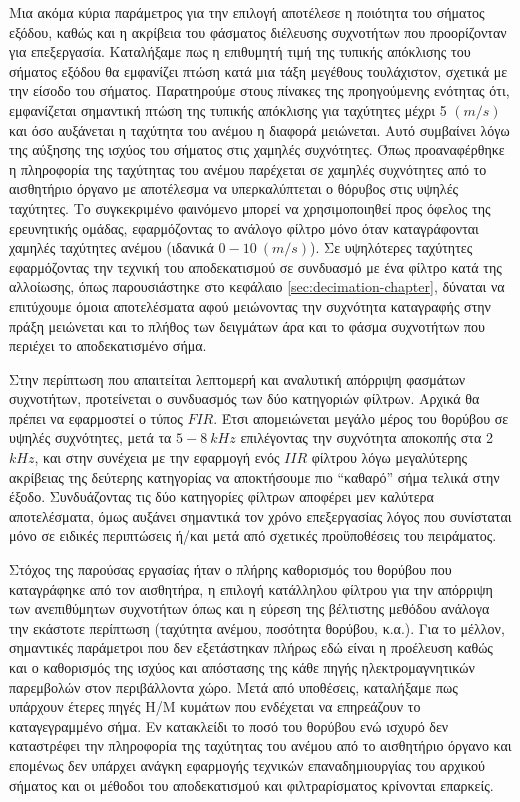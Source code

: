 \documentclass[breaklines=true, 12pt]{article}
\begin{document}
Μια ακόμα κύρια παράμετρος για την επιλογή αποτέλεσε η ποιότητα του σήματος
εξόδου, καθώς και η ακρίβεια του φάσματος διέλευσης συχνοτήτων που
προορίζονταν για επεξεργασία. Καταλήξαμε πως η επιθυμητή τιμή της τυπικής
απόκλισης του σήματος εξόδου θα εμφανίζει πτώση κατά μια τάξη μεγέθους
τουλάχιστον, σχετικά με την είσοδο του σήματος. Παρατηρούμε στους πίνακες της
προηγούμενης ενότητας ότι, εμφανίζεται σημαντική πτώση της τυπικής απόκλισης
για ταχύτητες μέχρι 5 \((m/s)\) και όσο αυξάνεται η ταχύτητα του ανέμου η διαφορά
μειώνεται. Αυτό συμβαίνει λόγω της αύξησης της ισχύος του σήματος στις χαμηλές
συχνότητες. Όπως προαναφέρθηκε η πληροφορία της ταχύτητας του ανέμου παρέχεται
σε χαμηλές συχνότητες από το αισθητήριο όργανο με αποτέλεσμα να υπερκαλύπτεται
ο θόρυβος στις υψηλές ταχύτητες. Το συγκεκριμένο φαινόμενο μπορεί να
χρησιμοποιηθεί προς όφελος της ερευνητικής ομάδας, εφαρμόζοντας το ανάλογο
φίλτρο μόνο όταν καταγράφονται χαμηλές ταχύτητες ανέμου (ιδανικά \(0-10\ (m/s)\)).
Σε υψηλότερες ταχύτητες εφαρμόζοντας την τεχνική του αποδεκατισμού σε συνδυασμό
με ένα φίλτρο κατά της αλλοίωσης, όπως παρουσιάστηκε στο κεφάλαιο
\ref{sec:decimation-chapter}, δύναται να επιτύχουμε όμοια αποτελέσματα αφού
μειώνοντας την συχνότητα καταγραφής στην πράξη μειώνεται και το πλήθος των
δειγμάτων άρα και το φάσμα συχνοτήτων που περιέχει το αποδεκατισμένο σήμα.

Στην περίπτωση που απαιτείται λεπτομερή και αναλυτική απόρριψη φασμάτων
συχνοτήτων, προτείνεται ο συνδυασμός των δύο κατηγοριών φίλτρων. Αρχικά θα
πρέπει να εφαρμοστεί ο τύπος \(FIR\). Έτσι απομειώνεται μεγάλο μέρος του θορύβου
σε υψηλές συχνότητες, μετά τα \(5-8\ kHz\) επιλέγοντας την συχνότητα αποκοπής στα
2 \(kHz\), και στην συνέχεια με την εφαρμογή ενός \(IIR\) φίλτρου λόγω μεγαλύτερης
ακρίβειας της δεύτερης κατηγορίας να αποκτήσουμε πιο “καθαρό” σήμα τελικά στην
έξοδο. Συνδυάζοντας τις δύο κατηγορίες φίλτρων αποφέρει μεν καλύτερα αποτελέσματα,
όμως αυξάνει σημαντικά τον χρόνο επεξεργασίας λόγος που συνίσταται μόνο σε
ειδικές περιπτώσεις ή/και μετά από σχετικές προϋποθέσεις του πειράματος.

Στόχος της παρούσας εργασίας ήταν ο πλήρης καθορισμός του θορύβου που
καταγράφηκε από τον αισθητήρα,
η επιλογή κατάλληλου φίλτρου για την απόρριψη των ανεπιθύμητων συχνοτήτων όπως
και η εύρεση της βέλτιστης μεθόδου ανάλογα την εκάστοτε περίπτωση (ταχύτητα
ανέμου, ποσότητα θορύβου, κ.α.). Για το μέλλον, σημαντικές παράμετροι που δεν
εξετάστηκαν πλήρως εδώ είναι η προέλευση καθώς και ο καθορισμός της ισχύος και
απόστασης της κάθε πηγής ηλεκτρομαγνητικών παρεμβολών στον περιβάλλοντα χώρο.
Μετά από υποθέσεις, καταλήξαμε πως υπάρχουν έτερες πηγές Η/Μ κυμάτων που ενδέχεται
να επηρεάζουν το καταγεγραμμένο σήμα. Εν κατακλείδι το ποσό του θορύβου ενώ
ισχυρό δεν καταστρέφει την πληροφορία της ταχύτητας του ανέμου από το
αισθητήριο όργανο και επομένως δεν υπάρχει ανάγκη εφαρμογής τεχνικών
επαναδημιουργίας του αρχικού σήματος και οι μέθοδοι του αποδεκατισμού και
φιλτραρίσματος κρίνονται επαρκείς.
\clearpage
\end{document}
